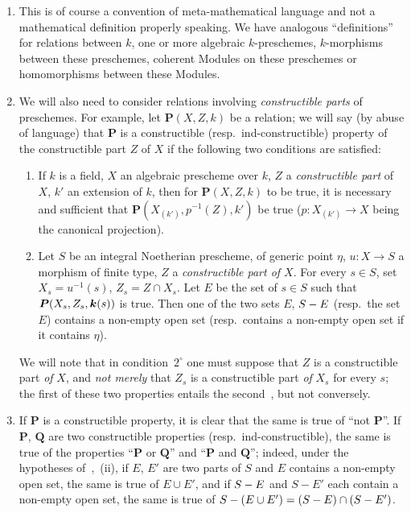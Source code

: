 \begin{remarks}[9.2.2]
\label{IV.9.2.2}
\begin{enumerate}[label=(\roman*)]
  \item This is of course a convention of meta-mathematical language and not a mathematical definition properly speaking.
We have analogous ``definitions'' for relations between $k$, one or more algebraic $k$-preschemes, $k$-morphisms between these preschemes, coherent Modules on these preschemes or homomorphisms between these Modules.
  \item We will also need to consider relations involving \emph{constructible parts} of preschemes.
For example, let $\boldsymbol{P}(X,Z,k)$ be a relation; we will say (by abuse of language) that $\boldsymbol{P}$ is a constructible (resp.\ ind-constructible) property of the constructible part $Z$ of $X$ if the following two conditions are satisfied:
\begin{enumerate}[label=$\arabic*^{\mathrm{o}}$]
  \item If $k$ is a field, $X$ an algebraic prescheme over $k$, $Z$ a \emph{constructible part} of $X$, $k'$ an extension of $k$, then for $\boldsymbol{P}(X,Z,k)$ to be true, it is necessary and sufficient that $\boldsymbol{P}(X_{(k')},p^{-1}(Z),k')$ be true ($p:X_{(k')}\to X$ being the canonical projection).
  \item Let $S$ be an integral Noetherian prescheme, of generic point $\eta$, $u:X\to S$ a morphism of finite type, $Z$ a \emph{constructible part of $X$}.
For every $s\in S$, set $X_s=u^{-1}(s)$, $Z_s=Z\cap X_s$.
Let $E$ be the set of $s\in S$ such that $\boldsymbol{P}(X_s,Z_s,\boldsymbol{k}(s))$ is true.
Then one of the two sets $E$, $S- E$ (resp.\ the set $E$) contains a non-empty open set (resp.\ contains a non-empty open set if it contains $\eta$).
\end{enumerate}

We will note that in condition~$2^\circ$ one must suppose that $Z$ is a constructible part \emph{of} $X$, and \emph{not merely} that $Z_s$ is a constructible part \emph{of} $X_s$ for every $s$; the first of these two properties entails the second~, but not conversely.

  \item If $\boldsymbol{P}$ is a constructible property, it is clear that the same is true of ``not $\boldsymbol{P}$''.
If $\boldsymbol{P}$, $\boldsymbol{Q}$ are two constructible properties (resp.\ ind-constructible), the same is true of the properties ``$\boldsymbol{P}$ or $\boldsymbol{Q}$'' and ``$\boldsymbol{P}$ and $\boldsymbol{Q}$''; indeed, under the hypotheses of~,~(ii), if $E$, $E'$ are two parts of $S$ and $E$ contains a non-empty open set, the same is true of $E\cup E'$, and if $S- E$ and $S-E'$ each contain a non-empty open set, the same is true of $S-(E\cup E')=(S- E)\cap(S- E')$.


\end{enumerate}
\end{remarks}
